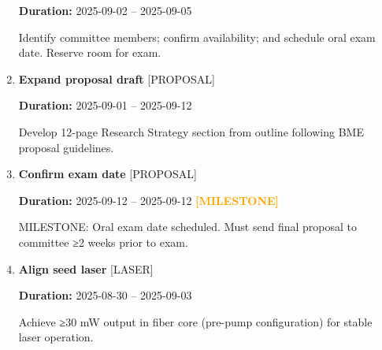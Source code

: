 \documentclass[landscape,a4paper]{article}
\begin{document}
\begin{enumerate}[leftmargin=1.5cm, itemsep=1em]
          \vspace{0.2em}
          \textcolor{black!70}{\textbf{Duration:} 2025-09-02 -- 2025-09-05}

          \vspace{0.4em}
          \begin{minipage}[t]{0.9\textwidth}
          \textcolor{black!85}{Identify committee members; confirm availability; and schedule oral exam date. Reserve room for exam.}
          \end{minipage}


    \item \textcolor{researchcore}{\textbf{\large Expand proposal draft}}
          \hfill \textcolor{black!60}{\small [PROPOSAL]}
          
          \vspace{0.2em}
          \textcolor{black!70}{\textbf{Duration:} 2025-09-01 -- 2025-09-12}

          \vspace{0.4em}
          \begin{minipage}[t]{0.9\textwidth}
          \textcolor{black!85}{Develop 12-page Research Strategy section from outline following BME proposal guidelines.}
          \end{minipage}


    \item \textcolor{researchcore}{\textbf{\large Confirm exam date}}
          \hfill \textcolor{black!60}{\small [PROPOSAL]}
          
          \vspace{0.2em}
          \textcolor{black!70}{\textbf{Duration:} 2025-09-12 -- 2025-09-12}
          \textcolor{orange}{\textbf{ [MILESTONE]}}\n
          \vspace{0.4em}
          \begin{minipage}[t]{0.9\textwidth}
          \textcolor{black!85}{MILESTONE: Oral exam date scheduled. Must send final proposal to committee ≥2 weeks prior to exam.}
          \end{minipage}


    \item \textcolor{researchexp}{\textbf{\large Align seed laser}}
          \hfill \textcolor{black!60}{\small [LASER]}
          
          \vspace{0.2em}
          \textcolor{black!70}{\textbf{Duration:} 2025-08-30 -- 2025-09-03}

          \vspace{0.4em}
          \begin{minipage}[t]{0.9\textwidth}
          \textcolor{black!85}{Achieve ≥30 mW output in fiber core (pre-pump configuration) for stable laser operation.}
          \end{minipage}



\end{enumerate}
\end{document}
